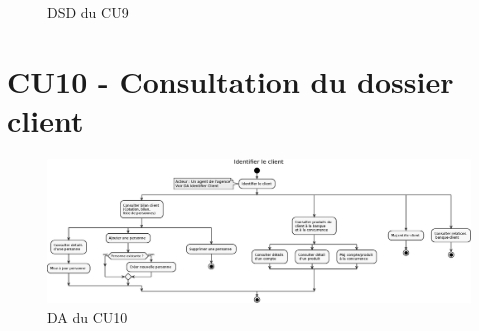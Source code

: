 \begin{figure}[H]
\noindent{}
\caption{DSD du CU9}
\end{figure}

\clearpage
\section{CU10 - Consultation du dossier client}
\begin{figure}[H]
\centering
\includegraphics[width=22cm, angle=90]{figures/eps/DA_CU10.eps}
\caption{DA du CU10}
\end{figure}


